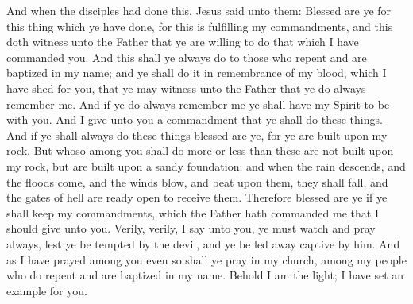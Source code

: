 And when the disciples had done this, Jesus said unto them: Blessed are ye for this thing which ye have done, for this is fulfilling my commandments, and this doth witness unto the Father that ye are willing to do that which I have commanded you.
\bverse \iffalse And this shall ye always do to those who repent and are baptized in my name; and ye shall do it in remembrance of my blood, which I have shed for you, that ye may witness unto the Father that ye do always remember me. And if ye do always remember me ye shall have my Spirit to be with you. \fi
And this shall ye always do to those who repent and are baptized in my name; and ye shall do it in remembrance of my blood, which I have shed for you, that ye may witness unto the Father that ye do always remember me. And if ye do always remember me ye shall have my Spirit to be with you.
\bverse \iffalse And I give unto you a commandment that ye shall do these things. And if ye shall always do these things blessed are ye, for ye are built upon my rock. \fi
And I give unto you a commandment that ye shall do these things. And if ye shall always do these things blessed are ye, for ye are built upon my rock.
\bverse \iffalse But whoso among you shall do more or less than these are not built upon my rock, but are built upon a sandy foundation; and when the rain descends, and the floods come, and the winds blow, and beat upon them, they shall fall, and the gates of hell are ready open to receive them. \fi
But whoso among you shall do more or less than these are not built upon my rock, but are built upon a sandy foundation; and when the rain descends, and the floods come, and the winds blow, and beat upon them, they shall fall, and the gates of hell are ready open to receive them.
\bverse \iffalse Therefore blessed are ye if ye shall keep my commandments, which the Father hath commanded me that I should give unto you. \fi
Therefore blessed are ye if ye shall keep my commandments, which the Father hath commanded me that I should give unto you.
\bverse \iffalse Verily, verily, I say unto you, ye must watch and pray always, lest ye be tempted by the devil, and ye be led away captive by him. \fi
Verily, verily, I say unto you, ye must watch and pray always, lest ye be tempted by the devil, and ye be led away captive by him.
\bverse \iffalse And as I have prayed among you even so shall ye pray in my church, among my people who do repent and are baptized in my name. Behold I am the light; I have set an example for you. \fi
And as I have prayed among you even so shall ye pray in my church, among my people who do repent and are baptized in my name. Behold I am the light; I have set an example for you.
